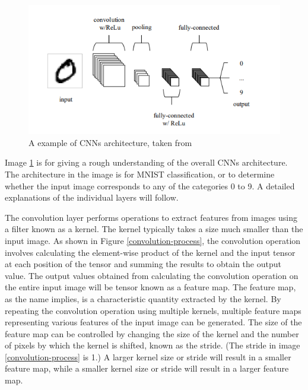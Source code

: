 \begin{figure}[h]
  \centering
  \includegraphics[width=135truemm]{resources/2_background/ex-CNN.png}
  \caption{
    A example of CNNs architecture,
    taken from \cite{o2015introduction}
  }
  \label{example-of-CNN}
\end{figure}
Image \ref{example-of-CNN} is for giving a rough understanding of the overall 
CNNs architecture.
The architecture in the image is for MNIST \cite{deng2012mnist} classification, 
or to determine whether the input image corresponds to any of the categories 
0 to 9. A detailed explanations of the individual layers will follow.

The convolution layer performs operations to extract features from images using 
a filter known as a kernel.
The kernel typically takes a size much smaller than the input image. 
As shown in Figure \ref{convolution-process}, the convolution operation involves calculating the 
element-wise product of the kernel and the input tensor at each position of 
the tensor and summing the results to obtain the output value. 
The output values obtained from calculating the convolution operation on the 
entire input image will be tensor known as a feature map.
The feature map, as the name implies, is a characteristic quantity 
extracted by the kernel. By repeating the convolution operation using multiple
kernels, multiple feature maps representing various features of the input 
image can be generated. 
The size of the feature map can be controlled by changing the size of the kernel and the number 
of pixels by which the kernel is shifted, known as the stride. 
(The stride in image \ref{convolution-process} is 1.)
A larger kernel size or stride will result in a smaller feature map, 
while a smaller kernel size or stride will result in a larger feature map.


